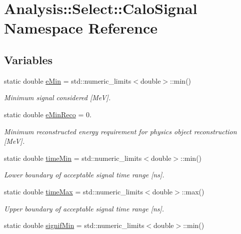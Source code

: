 \hypertarget{namespaceAnalysis_1_1Select_1_1CaloSignal}{}\section{Analysis\+:\+:Select\+:\+:Calo\+Signal Namespace Reference}
\label{namespaceAnalysis_1_1Select_1_1CaloSignal}
\subsection*{Variables}
\begin{DoxyCompactItemize}
\item 
static double \hyperlink{namespaceAnalysis_1_1Select_1_1CaloSignal_a1a58695e9774b4a545d92fca555eb0c0}{e\+Min} = std\+::numeric\+\_\+limits$<$double$>$\+::min()
\begin{DoxyCompactList}\small\item\em Minimum signal considered \mbox{[}MeV\mbox{]}. \end{DoxyCompactList}\item 
static double \hyperlink{namespaceAnalysis_1_1Select_1_1CaloSignal_afe6b59ea6218484d4f8d976594af5cba}{e\+Min\+Reco} = 0.
\begin{DoxyCompactList}\small\item\em Minimum reconstructed energy requirement for physics object reconstruction \mbox{[}MeV\mbox{]}. \end{DoxyCompactList}\item 
static double \hyperlink{namespaceAnalysis_1_1Select_1_1CaloSignal_abeb7a2c3395cdb72a38f5834405bf805}{time\+Min} = std\+::numeric\+\_\+limits$<$double$>$\+::min()
\begin{DoxyCompactList}\small\item\em Lower boundary of acceptable signal time range \mbox{[}ns\mbox{]}. \end{DoxyCompactList}\item 
static double \hyperlink{namespaceAnalysis_1_1Select_1_1CaloSignal_a74dfc4bcd69d76f68f67e638a3b26e67}{time\+Max} = std\+::numeric\+\_\+limits$<$double$>$\+::max()
\begin{DoxyCompactList}\small\item\em Upper boundary of acceptable signal time range \mbox{[}ns\mbox{]}. \end{DoxyCompactList}\item 
static double \hyperlink{namespaceAnalysis_1_1Select_1_1CaloSignal_a84374213c119a3c9850969eb36fca6d9}{signif\+Min} = std\+::numeric\+\_\+limits$<$double$>$\+::min()

\end{DoxyCompactItemize}
